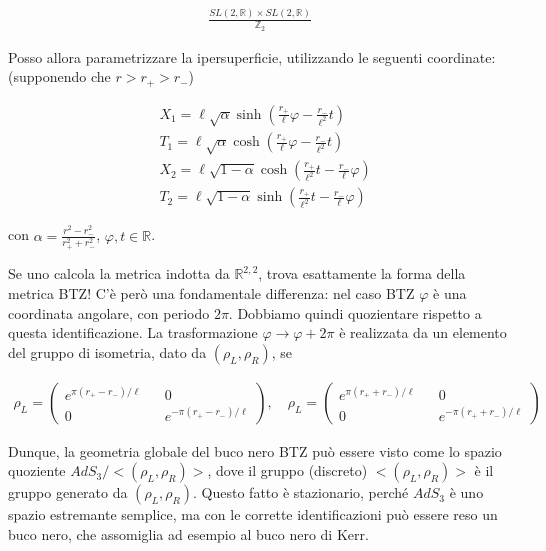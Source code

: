 \documentclass{report}
\begin{document}
\begin{align}
    \frac{SL(2, \mathbb{R}) \times SL(2, \mathbb{R})}{\mathbb{Z}_2}
\end{align}

Posso allora parametrizzare la ipersuperficie, utilizzando le seguenti coordinate: (supponendo che \(r > r_+ > r_-\))

\begin{align}
    &X_1 = \ell\sqrt{\alpha}\sinh\left(\frac{r_+}{\ell}\varphi - \frac{r_-}{\ell^2}t \right) \\
    &T_1 = \ell\sqrt{\alpha}\cosh\left(\frac{r_+}{\ell}\varphi - \frac{r_-}{\ell^2}t \right) \\
    &X_2 = \ell\sqrt{1-\alpha}\cosh\left(\frac{r_+}{\ell^2}t - \frac{r_-}{\ell}\varphi \right) \\
    &T_2 = \ell\sqrt{1-\alpha}\sinh\left(\frac{r_+}{\ell^2}t - \frac{r_-}{\ell}\varphi \right)
\end{align}

con \(\alpha = \frac{r^2 - r^2_-}{r^2_+ + r^2_-}\), \(\varphi, t \in \mathbb{R}\). 

Se uno calcola la metrica indotta da \(\mathbb{R}^{2, 2}\), trova esattamente la forma della metrica BTZ! C'è però una fondamentale differenza: nel caso BTZ \(\varphi\) è una coordinata angolare, con periodo \(2\pi\). Dobbiamo quindi quozientare rispetto a questa identificazione. La trasformazione \(\varphi \rightarrow \varphi + 2\pi\) è realizzata da un elemento del gruppo di isometria, dato da \((\rho_L, \rho_R)\), se 

\begin{align}
    \rho_L = \begin{pmatrix}
        e^{\pi(r_+-r_-)/\ell} && 0 \\ 
        0 && e^{-\pi(r_+-r_-)/\ell}
    \end{pmatrix}, \quad
    \rho_L = \begin{pmatrix}
        e^{\pi(r_++r_-)/\ell} && 0 \\ 
        0 && e^{-\pi(r_++r_-)/\ell}
    \end{pmatrix}
\end{align}

Dunque, la geometria globale del buco nero BTZ può essere visto come lo spazio quoziente \(AdS_3/<(\rho_L, \rho_R)>\), dove il gruppo (discreto) \(<(\rho_L, \rho_R)>\) è il gruppo generato da \((\rho_L, \rho_R)\). Questo fatto è stazionario, perché \(AdS_3\) è uno spazio estremante semplice, ma con le corrette identificazioni può essere reso un buco nero, che assomiglia ad esempio al buco nero di Kerr. 
\end{document}
